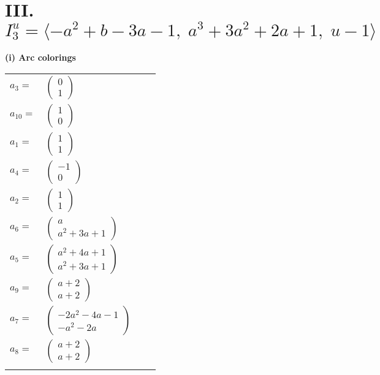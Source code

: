 \documentclass[1p]{elsarticle_modified}
\theoremstyle{definition}
\begin{document}
\centering \section*{III. $I^u_{3}= \langle - a^2+b-3 a-1,\;a^3+3 a^2+2 a+1,\;u-1 \rangle$}
\flushleft \textbf{(i) Arc colorings}\\
\begin{tabular}{m{7pt} m{180pt} m{7pt} m{180pt} }
\flushright $a_{3}=$&$\begin{pmatrix}0\\1\end{pmatrix}$ \\
\flushright $a_{10}=$&$\begin{pmatrix}1\\0\end{pmatrix}$ \\
\flushright $a_{1}=$&$\begin{pmatrix}1\\1\end{pmatrix}$ \\
\flushright $a_{4}=$&$\begin{pmatrix}-1\\0\end{pmatrix}$ \\
\flushright $a_{2}=$&$\begin{pmatrix}1\\1\end{pmatrix}$ \\
\flushright $a_{6}=$&$\begin{pmatrix}a\\a^2+3 a+1\end{pmatrix}$ \\
\flushright $a_{5}=$&$\begin{pmatrix}a^2+4 a+1\\a^2+3 a+1\end{pmatrix}$ \\
\flushright $a_{9}=$&$\begin{pmatrix}a+2\\a+2\end{pmatrix}$ \\
\flushright $a_{7}=$&$\begin{pmatrix}-2 a^2-4 a-1\\- a^2-2 a\end{pmatrix}$ \\
\flushright $a_{8}=$&$\begin{pmatrix}a+2\\a+2\end{pmatrix}$\\&\end{tabular}
\end{document}
